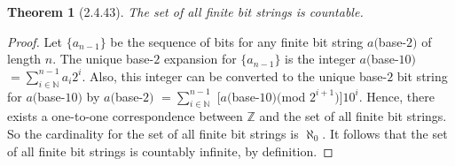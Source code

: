 \documentclass[a4paper, 12pt]{article}
\theoremstyle{plain}
\newtheorem*{theorem*}{Theorem}
\begin{document}
	
	\begin{theorem*}[2.4.43]
		The set of all finite bit strings is countable.
	\end{theorem*}
	
	\begin{proof}
		Let $\{a_{n-1}\}$ be the sequence of bits for any finite bit string $a($base-$2)$ of length $n$. The unique base-$2$ expansion for $\{a_{n-1}\}$ is the integer \newline $a($base-$10)$ $= 
		\sum_{i \in \mathbb{N}}^{n-1} a_{i}2^{i}$. Also, this integer can be converted to the unique base-$2$ bit string for $a($base-$10)$ by $a($base-$2)$ $= \sum_{i \in \mathbb{N}}^{n-1}$ $[a($base-$10)($mod $2^{i+1})]10^{i}$. Hence, there exists a one-to-one correspondence between $\mathbb{Z}$ and the set of all finite bit strings. So the cardinality for the set of all finite bit strings is $\aleph_0$. It follows that the set of all finite bit strings is countably infinite, by definition.
	\end{proof}
\end{document}
